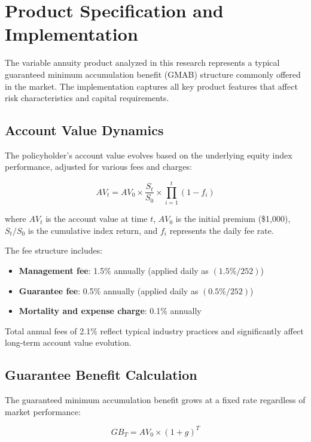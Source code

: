 \documentclass[12pt,a4paper]{report}
\begin{document}
\section{Product Specification and Implementation}

The variable annuity product analyzed in this research represents a typical guaranteed minimum accumulation benefit (GMAB) structure commonly offered in the market. The implementation captures all key product features that affect risk characteristics and capital requirements.

\subsection{Account Value Dynamics}

The policyholder's account value evolves based on the underlying equity index performance, adjusted for various fees and charges:

\begin{equation}
AV_t = AV_0 \times \frac{S_t}{S_0} \times \prod_{i=1}^{t} (1 - f_i)
\end{equation}

where $AV_t$ is the account value at time $t$, $AV_0$ is the initial premium (\$1,000), $S_t/S_0$ is the cumulative index return, and $f_i$ represents the daily fee rate.

The fee structure includes:
\begin{itemize}
\item \textbf{Management fee}: 1.5\% annually (applied daily as $(1.5\%/252)$)
\item \textbf{Guarantee fee}: 0.5\% annually (applied daily as $(0.5\%/252)$)
\item \textbf{Mortality and expense charge}: 0.1\% annually
\end{itemize}

Total annual fees of 2.1\% reflect typical industry practices and significantly affect long-term account value evolution.

\subsection{Guarantee Benefit Calculation}

The guaranteed minimum accumulation benefit grows at a fixed rate regardless of market performance:

\begin{equation}
GB_T = AV_0 \times (1 + g)^T
\end{equation}
\end{document}
